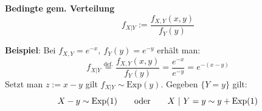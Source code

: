 
\notation \textbf{Bedingte gem. Verteilung}\\
$$
    f_{X \vert Y} := \frac{f_{X,Y}(x,y)}{f_Y(y)}
$$

{\footnotesize
    \textbf{Beispiel}: Bei $f_{X,Y}=e^{-x},\ f_Y(y)=e^{-y}$ erhält man:
    $$
        f_{X|Y} \overset{\text{def.}}{=} \frac{f_{X,Y}(x,y)}{f_Y(y)} = \frac{e^{-x}}{e^{-y}} = e^{-(x-y)}
    $$
    Setzt man $z:=x-y$ gilt $f_{X|Y}\sim\text{Exp}(y)$. Gegeben $\{Y=y\}$ gilt:
    $$
        X - y \sim \text{Exp}(1) \qquad \text{oder} \qquad X \ |\  Y=y \sim y + \text{Exp}(1)
    $$
}